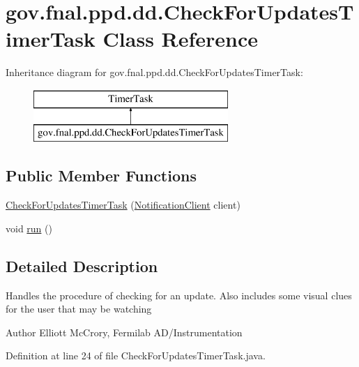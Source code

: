 \hypertarget{classgov_1_1fnal_1_1ppd_1_1dd_1_1CheckForUpdatesTimerTask}{\section{gov.\-fnal.\-ppd.\-dd.\-Check\-For\-Updates\-Timer\-Task Class Reference}
\label{classgov_1_1fnal_1_1ppd_1_1dd_1_1CheckForUpdatesTimerTask}
}
Inheritance diagram for gov.\-fnal.\-ppd.\-dd.\-Check\-For\-Updates\-Timer\-Task\-:\begin{figure}[H]
\begin{center}
\leavevmode
\includegraphics[height=2.000000cm]{classgov_1_1fnal_1_1ppd_1_1dd_1_1CheckForUpdatesTimerTask}
\end{center}
\end{figure}
\subsection*{Public Member Functions}
\begin{DoxyCompactItemize}
\item 
\hyperlink{classgov_1_1fnal_1_1ppd_1_1dd_1_1CheckForUpdatesTimerTask_afc8489823df49540e62221e4c3eb76d8}{Check\-For\-Updates\-Timer\-Task} (\hyperlink{interfacegov_1_1fnal_1_1ppd_1_1dd_1_1util_1_1NotificationClient}{Notification\-Client} client)
\item 
void \hyperlink{classgov_1_1fnal_1_1ppd_1_1dd_1_1CheckForUpdatesTimerTask_adffb4d5d1b38cfadb6ed708cb2b793fe}{run} ()
\end{DoxyCompactItemize}


\subsection{Detailed Description}
Handles the procedure of checking for an update. Also includes some visual clues for the user that may be watching

\begin{DoxyAuthor}{Author}
Elliott Mc\-Crory, Fermilab A\-D/\-Instrumentation 
\end{DoxyAuthor}


Definition at line 24 of file Check\-For\-Updates\-Timer\-Task.\-java.



